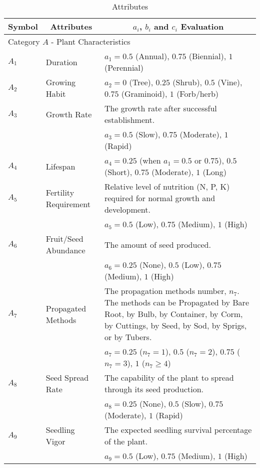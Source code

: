 \documentclass[12pt]{article}
\begin{document}
		{
			\fontsize{10}{14}\selectfont
			{
			\begin{longtable}{p{0.2in}p{1.5in}p{4.3in}}
				
				\caption{Attributes}
				\label{tb:attributes}\\
				
				\toprule
				\multicolumn{1}{c}{\textbf{Symbol}} 
					& \multicolumn{1}{c}{\textbf{Attributes}}
					& \multicolumn{1}{c}{\textbf{$a_i$, $b_i$ and $c_i$ Evaluation}} \\
			
				\toprule
				\multicolumn{3}{l}{Category $A$ - Plant Characteristics}\\
				\midrule
				
				$A_1$ & Duration & $a_1=0.5$ (Annual), $0.75$ (Biennial), $1$ (Perennial)\\
				$A_2$ & Growing Habit & $a_2=0$ (Tree), $0.25$ (Shrub), $0.5$ (Vine), $0.75$ (Graminoid), $1$ (Forb/herb)\\ 
				$A_3$ & Growth Rate & The growth rate after successful establishment.\\
					&& $a_3=0.5$ (Slow), $0.75$ (Moderate), $1$ (Rapid)\\
				$A_4$ & Lifespan & $a_4=0.25$ (when $a_1=0.5$ or $0.75$), $0.5$ (Short), $0.75$ (Moderate), $1$ (Long) \\
				$A_5$ & Fertility Requirement & Relative level of nutrition (N, P, K) required for normal growth and development.\\
					 && $a_5=0.5$ (Low), $0.75$ (Medium), $1$ (High)\\
				$A_6$ & Fruit/Seed Abundance & The amount of seed produced.\\
					&& $a_6=0.25$ (None), $0.5$ (Low), $0.75$ (Medium), $1$ (High)\\
				$A_7$ & Propagated Methods & The propagation methods number, $n_7$. The methods can be Propagated by Bare Root, by Bulb, by Container, by Corm, by Cuttings, by Seed, by Sod, by Sprigs, or by Tubers. \\
					&& $a_7=0.25$ ($n_7=1$), $0.5$ ($n_7=2$), $0.75$ ($n_7=3$), $1$ ($n_7\geq4$)\\
				$A_8$ & Seed Spread Rate & The capability of the plant to spread through its seed production.\\
					&& $a_8=0.25$ (None), $0.5$ (Slow), $0.75$ (Moderate), $1$ (Rapid)\\
				$A_9$ & Seedling Vigor & The expected seedling survival percentage of the plant.\\
					&& $a_9=0.5$ (Low), $0.75$ (Medium), $1$ (High)\\
				

\end{longtable}}}
\end{document}
